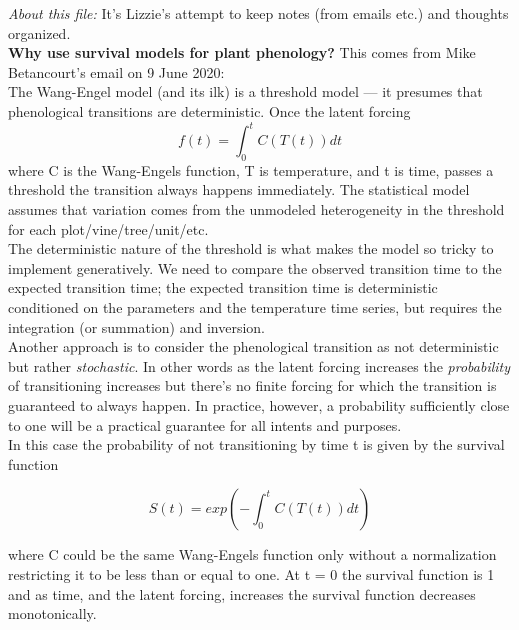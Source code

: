 \documentclass[11pt,letter]{article}
\begin{document}

\renewcommand{\refname}{\CHead{}}

\emph{About this file:} It's Lizzie's attempt to keep notes (from emails etc.) and thoughts organized.\\

{\bf Why use survival models for plant phenology?} This comes from Mike Betancourt's email on 9 June 2020:\\

The Wang-Engel model (and its ilk) is a threshold model — it presumes 
that phenological transitions are deterministic.  Once the latent forcing 
\begin{equation*}
f(t) = \int_{0}^{t} C(T(t)) dt
\end{equation*}
where C is the Wang-Engels function, T is temperature, and t is time,
passes a threshold the transition always happens immediately.  The 
statistical model assumes that variation comes from the unmodeled 
heterogeneity in the threshold for each plot/vine/tree/unit/etc.\\

The deterministic nature of the threshold is what makes the model so
tricky to implement generatively.  We need to compare the observed 
transition time to the expected transition time; the expected transition 
time is deterministic conditioned on the parameters and the temperature 
time series, but requires the integration (or summation) and inversion.\\

Another approach is to consider the phenological transition as not 
deterministic but rather \emph{stochastic}.  In other words as the latent 
forcing increases the \emph{probability} of transitioning increases but there’s 
no finite forcing for which the transition is guaranteed to always happen.
In practice, however, a probability sufficiently close to one will be a 
practical guarantee for all intents and purposes.\\

In this case the probability of not transitioning by time t is given by the 
survival function

\begin{equation*}
S(t) = exp( - \int_{0}^{t} C(T(t)) dt)
\end{equation*}

where C could be the same Wang-Engels function only without a 
normalization restricting it to be less than or equal to one.  At t = 0
the survival function is 1 and as time, and the latent forcing, increases
the survival function decreases monotonically.
\end{document}

